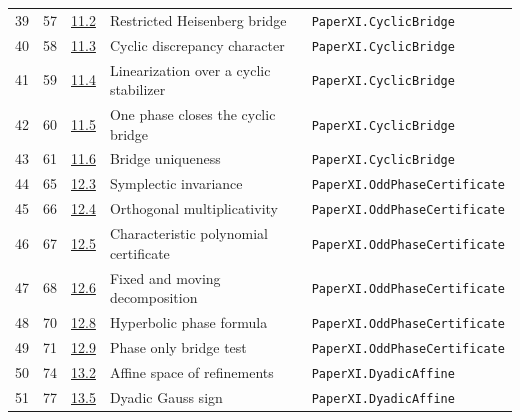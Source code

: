 \documentclass[10pt,oneside]{book}
\begin{document}
\begin{longtable}{@{}p{}p{}p{}>{\raggedright\arraybackslash}p{}p{}@{}}
39&57&\href{https://komorebi.invalid/b06/obligation_39}{11.2}&Restricted Heisenberg bridge&\nolinkurl{PaperXI.CyclicBridge}\\

40&58&\href{https://komorebi.invalid/b06/obligation_40}{11.3}&Cyclic discrepancy character&\nolinkurl{PaperXI.CyclicBridge}\\

41&59&\href{https://komorebi.invalid/b06/obligation_41}{11.4}&Linearization over a cyclic stabilizer&\nolinkurl{PaperXI.CyclicBridge}\\

42&60&\href{https://komorebi.invalid/b06/obligation_42}{11.5}&One phase closes the cyclic bridge&\nolinkurl{PaperXI.CyclicBridge}\\

43&61&\href{https://komorebi.invalid/b06/obligation_43}{11.6}&Bridge uniqueness&\nolinkurl{PaperXI.CyclicBridge}\\

44&65&\href{https://komorebi.invalid/b06/obligation_44}{12.3}&Symplectic invariance&\nolinkurl{PaperXI.OddPhaseCertificate}\\

45&66&\href{https://komorebi.invalid/b06/obligation_45}{12.4}&Orthogonal multiplicativity&\nolinkurl{PaperXI.OddPhaseCertificate}\\

46&67&\href{https://komorebi.invalid/b06/obligation_46}{12.5}&Characteristic polynomial certificate&\nolinkurl{PaperXI.OddPhaseCertificate}\\

47&68&\href{https://komorebi.invalid/b06/obligation_47}{12.6}&Fixed and moving decomposition&\nolinkurl{PaperXI.OddPhaseCertificate}\\

48&70&\href{https://komorebi.invalid/b06/obligation_48}{12.8}&Hyperbolic phase formula&\nolinkurl{PaperXI.OddPhaseCertificate}\\

49&71&\href{https://komorebi.invalid/b06/obligation_49}{12.9}&Phase only bridge test&\nolinkurl{PaperXI.OddPhaseCertificate}\\

50&74&\href{https://komorebi.invalid/b06/obligation_50}{13.2}&Affine space of refinements&\nolinkurl{PaperXI.DyadicAffine}\\

51&77&\href{https://komorebi.invalid/b06/obligation_51}{13.5}&Dyadic Gauss sign&\nolinkurl{PaperXI.DyadicAffine}\\


\end{longtable}
\end{document}
